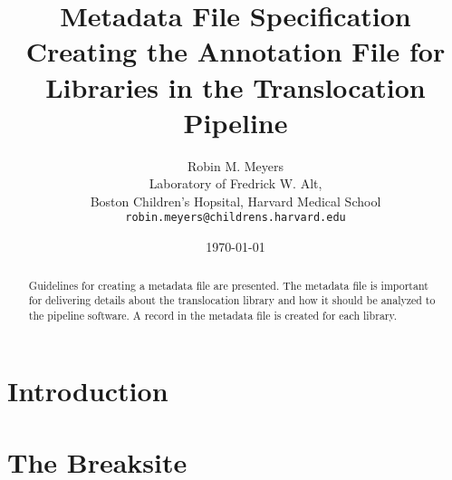 \documentclass{article}
\begin{document}
\title{Metadata File Specification \\ \large Creating the Annotation File for Libraries in the Translocation Pipeline}
\author{Robin M. Meyers\\
  Laboratory of Fredrick W. Alt,\\
  Boston Children's Hopsital, Harvard Medical School\\
  \texttt{robin.meyers@childrens.harvard.edu}}
\date{\today}
\maketitle

\begin{abstract}
Guidelines for creating a metadata file are presented. The metadata file is important for delivering details about the translocation library and how it should be analyzed to the pipeline software. A record in the metadata file is created for each library.
\end{abstract}

\section{Introduction}
\paragraph{}


\section{}

\section{The Breaksite}
\end{document}
